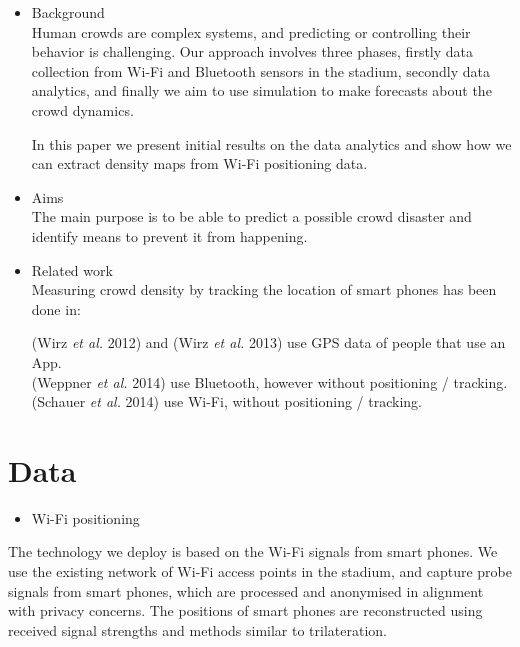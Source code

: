 \documentclass[10pt,a4paper]{article}
\begin{document}
\begin{itemize}

\item Background\\

Human crowds are complex systems, and predicting or controlling their behavior is challenging. Our approach involves three phases, firstly data collection from Wi-Fi and Bluetooth sensors in the stadium, secondly data analytics, and finally we aim to use simulation to make forecasts about the crowd dynamics. 

In this paper we present initial results on the data analytics and show how we can extract density maps from Wi-Fi positioning data. 

\item Aims\\

The main purpose is to be able to predict a possible crowd disaster and identify means to prevent it from happening. 

\item Related work\\

Measuring crowd density by tracking the location of smart phones has been done in:

(Wirz \textit{et al.} 2012) \cite{wirz:1} and (Wirz \textit{et al.} 2013) \cite{wirz:2} use GPS data of people that use an App.\\
(Weppner \textit{et al.} 2014) \cite{weppner:1} use Bluetooth, however without positioning / tracking.\\
(Schauer \textit{et al.} 2014) \cite{schauer:1} use Wi-Fi, without positioning / tracking.

\end{itemize}

\section{Data}

\begin{itemize}
\item Wi-Fi positioning
\end{itemize}

The technology we deploy is based on the Wi-Fi signals from smart phones. We use the existing network of Wi-Fi access points in the stadium, and capture probe signals from smart phones, which are processed and anonymised in alignment with privacy concerns. The positions of smart phones are reconstructed using received signal strengths and methods similar to trilateration. 
\end{document}
